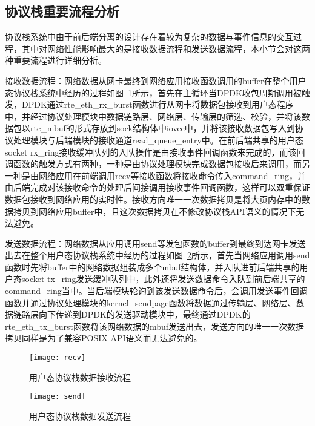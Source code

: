 \subsection{协议栈重要流程分析} %

协议栈系统中由于前后端分离的设计存在着较为复杂的数据与事件信息的交互过程，其中对网络性能影响最大的是接收数据流程和发送数据流程，本小节会对这两种重要流程进行详细分析。

接收数据流程：网络数据从网卡最终到网络应用接收函数调用的buffer在整个用户态协议栈系统中经历的过程如图~\ref{fig:recv}所示，首先在主循环当DPDK收包周期调用被触发，DPDK通过rte\_eth\_rx\_burst函数进行从网卡将数据包接收到用户态程序中，并经过协议处理模块中数据链路层、网络层、传输层的筛选、校验，并将该数据包以rte\_mbuf的形式存放到sock结构体中iovec中，并将该接收数据包写入到协议处理模块与后端模块的接收通道read\_queue\_entry中。在前后端共享的用户态socket rx\_ring接收缓冲队列的入队操作是由接收事件回调函数来完成的，而该回调函数的触发方式有两种，一种是由协议处理模块完成数据包接收后来调用，而另一种是由网络应用在前端调用recv等接收函数将接收命令传入command\_ring，并由后端完成对该接收命令的处理后间接调用接收事件回调函数，这样可以双重保证数据包接收到网络应用的实时性。接收方向唯一一次数据拷贝是将大页内存中的数据拷贝到网络应用buffer中，且这次数据拷贝在不修改协议栈API语义的情况下无法避免。

发送数据流程：网络数据从应用调用send等发包函数的buffer到最终到达网卡发送出去在整个用户态协议栈系统中经历的过程如图~\ref{fig:send}所示，首先当网络应用调用send函数时先将buffer中的网络数据组装成多个mbuf结构体，并入队进前后端共享的用户态socket tx\_ring发送缓冲队列中，此外还将发送数据命令入队到前后端共享的command\_ring当中。当后端模块轮询到该发送数据命令后，会调用发送事件回调函数并通过协议处理模块的kernel\_sendpage函数将数据通过传输层、网络层、数据链路层向下传递到DPDK的发送驱动模块中，最终通过DPDK的rte\_eth\_tx\_burst函数将该网络数据的mbuf发送出去，发送方向的唯一一次数据拷贝同样是为了兼容POSIX API语义而无法避免的。

\vspace{-10pt}
\begin{figure}[H] %
  \centering
  \texttt{[image: recv]}
  \caption{用户态协议栈数据接收流程}
  \label{fig:recv}
\end{figure}
\vspace{-10pt}

\vspace{-10pt}
\begin{figure}[H] %
  \centering
  \texttt{[image: send]}
  \caption{用户态协议栈数据发送流程}
  \label{fig:send}
\end{figure}
\vspace{-10pt}